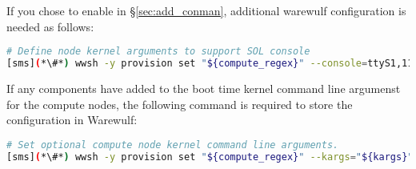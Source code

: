 If you chose to enable \conman{} in \S\ref{sec:add_conman}, additional
warewulf configuration is needed as follows:
\begin{lstlisting}[language=bash,keywords={},upquote=true]
# Define node kernel arguments to support SOL console
[sms](*\#*) wwsh -y provision set "${compute_regex}" --console=ttyS1,115200
\end{lstlisting}
If any components have added to the boot time kernel command line argumenst for the compute nodes,
the following command is required to store the configuration in Warewulf:
\begin{lstlisting}[language=bash,keywords={},upquote=true,basicstyle=\footnotesize\ttfamily]
# Set optional compute node kernel command line arguments.
[sms](*\#*) wwsh -y provision set "${compute_regex}" --kargs="${kargs}"
\end{lstlisting}

